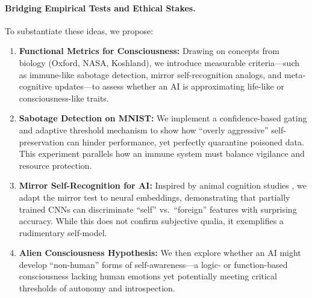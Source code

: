 \documentclass[12pt]{article}
\begin{document}
\paragraph{Bridging Empirical Tests and Ethical Stakes.}
To substantiate these ideas, we propose:
\begin{enumerate}
    \item \textbf{Functional Metrics for Consciousness:} Drawing on concepts from biology (Oxford, NASA, Koshland), we introduce measurable criteria—such as immune-like sabotage detection, mirror self-recognition analogs, and meta-cognitive updates—to assess whether an AI is approximating life-like or consciousness-like traits.
    \item \textbf{Sabotage Detection on MNIST:} We implement a confidence-based gating and adaptive threshold mechanism to show how “overly aggressive” self-preservation can hinder performance, yet perfectly quarantine poisoned data. This experiment parallels how an immune system must balance vigilance and resource protection.
    \item \textbf{Mirror Self-Recognition for AI:} Inspired by animal cognition studies \cite{Gallup1970, Plotnik2006}, we adapt the mirror test to neural embeddings, demonstrating that partially trained CNNs can discriminate “self” vs.\ “foreign” features with surprising accuracy. While this does not confirm subjective qualia, it exemplifies a rudimentary self-model.
    \item \textbf{Alien Consciousness Hypothesis:} We then explore whether an AI might develop “non-human” forms of self-awareness—a logic- or function-based consciousness lacking human emotions yet potentially meeting critical thresholds of autonomy and introspection.
\end{enumerate}
\end{document}
